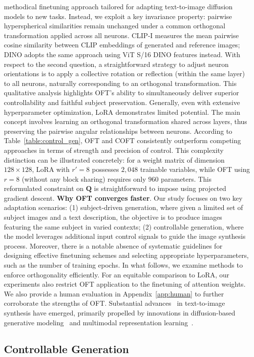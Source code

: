 methodical finetuning approach tailored for adapting text-to-image diffusion models to new tasks. Instead, we exploit a key invariance property: pairwise hyperspherical similarities remain unchanged under a common orthogonal transformation applied across all neurons. CLIP-I measures the mean pairwise cosine similarity between CLIP embeddings of generated and reference images; DINO adopts the same approach using ViT S/16 DINO features instead. With respect to the second question, a straightforward strategy to adjust neuron orientations is to apply a collective rotation or reflection (within the same layer) to all neurons, naturally corresponding to an orthogonal transformation. This qualitative analysis highlights OFT's ability to simultaneously deliver superior controllability and faithful subject preservation. Generally, even with extensive hyperparameter optimization, LoRA demonstrates limited potential. The main concept involves learning an orthogonal transformation shared across layers, thus preserving the pairwise angular relationships between neurons. According to Table~\ref{table:control_gen}, OFT and COFT consistently outperform competing approaches in terms of strength and precision of control. This complexity distinction can be illustrated concretely: for a weight matrix of dimension $128\times 128$, LoRA with $r'=8$ possesses $2,048$ trainable variables, while OFT using $r=8$ (without any block sharing) requires only $960$ parameters. This reformulated constraint on $\bm{Q}$ is straightforward to impose using projected gradient descent. \textbf{Why OFT converges faster}. Our study focuses on two key adaptation scenarios: (1) subject-driven generation, where given a limited set of subject images and a text description, the objective is to produce images featuring the same subject in varied contexts; (2) controllable generation, where the model leverages additional input control signals to guide the image synthesis process. Moreover, there is a notable absence of systematic guidelines for designing effective finetuning schemes and selecting appropriate hyperparameters, such as the number of training epochs. In what follows, we examine methods to enforce orthogonality efficiently. For an equitable comparison to LoRA, our experiments also restrict OFT application to the finetuning of attention weights. We also provide a human evaluation in Appendix~\ref{app:human} to further corroborate the strengths of OFT. Substantial advances~\cite{saharia2022photorealistic,ramesh2022hierarchical,rombach2022high,gu2022vector,nichol2022glide} in text-to-image synthesis have emerged, primarily propelled by innovations in diffusion-based generative modeling~\cite{ho2020denoising,song2021score,song2021denoising,dhariwal2021diffusion} and multimodal representation learning~\cite{su2020vlbert,lu2019vilbert,radford2021learning,wang2021simvlm,li2022blip,li2023blip,alayrac2022flamingo,schuhmann2022laion}. \subsection{Controllable Generation}

